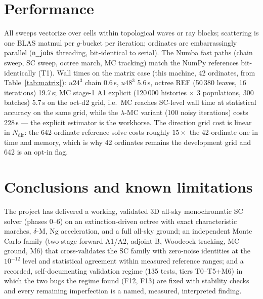 \documentclass[11pt,a4paper]{article}
\begin{document}
\section{Performance}
\label{sec:performance}

All sweeps vectorize over cells within topological waves or ray blocks;
scattering is one BLAS matmul per $g$-bucket per iteration; ordinates
are embarrassingly parallel (\texttt{n\_jobs} threading, bit-identical to
serial). The Numba fast paths (chain sweep, SC sweep, octree march, MC
tracking) match the NumPy references bit-identically (T1). Wall times on
the matrix case (this machine, 42 ordinates, from Table~\ref{tab:matrix}):
$u24^3$ chain 0.6\,s, $u48^3$ 5.6\,s, octree REF (50\,380 leaves, 16
iterations) 19.7\,s; MC stage-1 A1 explicit (120\,000 histories $\times$
3 populations, 300 batches) 5.7\,s on the oct-d2 grid, i.e.\ MC reaches
SC-level wall time at statistical accuracy on the same grid, while the
$\lambda$-MC variant (100 noisy iterations) costs 228\,s --- the explicit
estimator is the workhorse. The direction grid cost is linear in
$N_{\mathrm{dir}}$: the 642-ordinate reference solve costs roughly
$15\times$ the 42-ordinate one in time and memory, which is why 42
ordinates remains the development grid and 642 is an opt-in flag.

\section{Conclusions and known limitations}
\label{sec:conclusions}

The project has delivered a working, validated 3D all-sky monochromatic
SC solver (phases 0--6) on an extinction-driven octree with exact
characteristic marches, $\delta$-M, Ng acceleration, and a full
all-sky ground; an independent Monte Carlo family (two-stage forward A1/A2,
adjoint B, Woodcock tracking, MC ground, M6) that cross-validates the SC
family with zero-noise identities at the $10^{-12}$ level and statistical
agreement within measured reference ranges; and a recorded, self-documenting validation
regime (135 tests, tiers T0--T5+M6) in which the two bugs the regime found
(F12, F13) are fixed with stability checks and every remaining
imperfection is a named, measured, interpreted finding.
\end{document}
